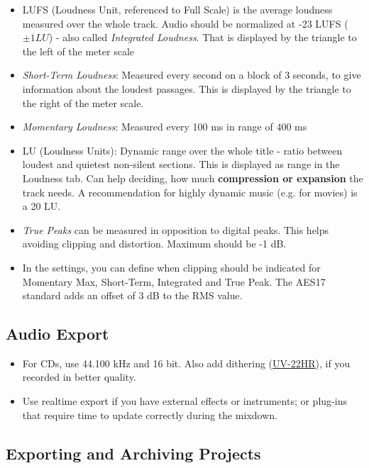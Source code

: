 \documentclass[10pt]{article}
\begin{document}
\begin{itemize}
	\item LUFS (Loudness Unit, referenced to Full Scale) is the average loudness measured over the whole track. Audio should be normalized at -23 LUFS ($\pm 1 LU$) - also called \textit{Integrated Loudness}. That is displayed by the triangle to the left of the meter scale
	\item \textit{Short-Term Loudness}: Measured every second on a block of 3 seconds, to give information about the loudest passages. This is displayed by the triangle to the right of the meter scale.
	\item \textit{Momentary Loudness}: Measured every 100 ms in range of 400 ms
	\item LU (Loudness Units): Dynamic range over the whole title - ratio between loudest and quietest non-silent sections. This is displayed as range in the Loudness tab. Can help deciding, how much \textbf{compression or expansion} the track needs. A recommendation for highly dynamic music (e.g. for movies) is a 20 LU.
	\item \textit{True Peaks} can be measured in opposition to digital peaks. This helps avoiding clipping and distortion. Maximum should be -1 dB.
	\item In the settings, you can define when clipping should be indicated for Momentary Max, Short-Term, Integrated and True Peak. The AES17 standard adds an offset of 3 dB to the RMS value.
\end{itemize}

\subsection{Audio Export}

\begin{itemize}
	\item For CDs, use 44.100 kHz and 16 bit. Also add dithering (\hyperlink{UV-22HR}{UV-22HR}), if you recorded in better quality.
	\item Use realtime export if you have external effects or instruments; or plug-ins that require time to update correctly during the mixdown.
\end{itemize}

\subsection{Exporting and Archiving Projects}
\end{document}
